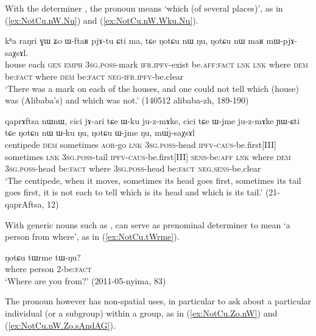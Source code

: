 With the determiner , the pronoun  means `which (of several places)', as in (\ref{ex:NotCu.nW.Nu}) and (\ref{ex:NotCu.nW.Wku.Nu}).

\begin{exe}
\ex \label{ex:NotCu.nW.Nu}
\gll kʰa raŋri ɣɯ ʑo ɯ-ftaʁ pjɤ-tu ɕti ma, tɕe ŋotɕu nɯ ŋu, ŋotɕu nɯ maʁ mɯ-pjɤ-saχsɤl. \\
house each \textsc{gen} \textsc{emph} \textsc{3sg}.\textsc{poss}-mark \textsc{ifr}.\textsc{ipfv}-exist be.\textsc{aff}:\textsc{fact} \textsc{lnk} \textsc{lnk} where \textsc{dem} be:\textsc{fact}  where \textsc{dem} be:\textsc{fact} \textsc{neg}-\textsc{ifr}.\textsc{ipfv}-be.clear \\
\glt `There was a mark on each of the houses, and one could not tell which (house) was (Alibaba's) and which was not.' (140512 alibaba-zh, 189-190)
\end{exe} 

\begin{exe}
\ex \label{ex:NotCu.nW.Wku.Nu}
\gll qaprɤftsa nɯnɯ, cici jɤ-ari tɕe ɯ-ku ju-z-mɤke, cici tɕe ɯ-jme ju-z-mɤke ɲɯ-ɕti tɕe ŋotɕu nɯ ɯ-ku ŋu, ŋotɕu ɯ-jme ŋu, mɯ́j-saχsɤl \\
centipede \textsc{dem} sometimes \textsc{aor}-go \textsc{lnk} \textsc{3sg}.\textsc{poss}-head \textsc{ipfv}-\textsc{caus}-be.first[III] sometimes \textsc{lnk} \textsc{3sg}.\textsc{poss}-tail \textsc{ipfv}-\textsc{caus}-be.first[III] \textsc{sens}-be:\textsc{aff} \textsc{lnk} where \textsc{dem} \textsc{3sg}.\textsc{poss}-head be:\textsc{fact} where \textsc{3sg}.\textsc{poss}-head be:\textsc{fact} \textsc{neg}.\textsc{sens}-be.clear \\
\glt `The centipede, when it moves, sometimes its head goes first, sometimes its tail goes first, it is not each to tell which is its head and which is its tail.' (21-qaprAftsa, 12)
\end{exe} 


With generic nouns such as ,  can serve as prenominal determiner to mean `a person from where', as in (\ref{ex:NotCu.tWrme}).

\begin{exe}
\ex \label{ex:NotCu.tWrme}
\gll ŋotɕu tɯrme tɯ-ŋu? \\
where person 2-be:\textsc{fact} \\
\glt `Where are you from?' (2011-05-nyima, 83)
\end{exe} 

The pronoun  however has non-spatial uses, in particular to ask about a particular individual (or a subgroup) within a group, as in (\ref{ex:NotCu.Zo.nW}) and (\ref{ex:NotCu.nW.Zo.sAndAG}).

